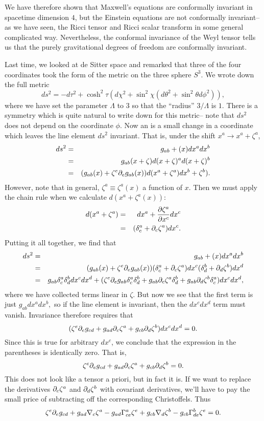 We have therefore shown that Maxwell's equations are conformally invariant in spacetime dimension $4$, but the Einstein equations are not conformally invariant-- as we have seen, the Ricci tensor and Ricci scalar transform in some general complicated way. Nevertheless, the conformal invariance of the Weyl tensor tells us that the purely gravitational degrees of freedom are conformally invariant.

Last time, we looked at de Sitter space and remarked that three of the four coordinates took the form of the metric on the three sphere $S^3$. We wrote down the full metric
$$ds^2=-d\tau^2+\cosh^2\tau \left(d\chi^2 + \sin^2\chi (d\theta^2+\sin^2\theta d\phi^2)\right),$$
where we have set the parameter $\Lambda$ to $3$ so that the ``radius'' $3/\Lambda$ is $1$.
There is a symmetry which is quite natural to write down for this metric-- note that $ds^2$ does not depend on the coordinate $\phi$. Now an  is a small change in a coordinate which leaves the line element $ds^2$ invariant. That is, under the shift $x^a\to x^a +\zeta^a$,
\begin{eqnarray*}
ds^2&=& g_{ab}+(x) dx^a dx^b\\
&=&g_{ab}(x+\zeta)d(x+\zeta)^a d(x+\zeta)^b\\
&=&(g_{ab}(x)+\zeta^e \partial_e g_{ab}(x)) d(x^a+\zeta^a) dx^b+\zeta^b).
\end{eqnarray*}
However, note that in general, $\zeta^a \equiv \zeta^a(x)$ a function of $x$. Then we must apply the chain rule when we calculate $d(x^a+\zeta^a(x)):$
\begin{eqnarray*}
d(x^a+\zeta^a)&=&dx^a+ \frac{\partial \zeta^a}{\partial x^c} dx^c\\
&=&(\delta^a_c +\partial_c \zeta^a)dx^c.
\end{eqnarray*}
Putting it all together, we find that
\begin{eqnarray*}
ds^2&=& g_{ab}+(x) dx^a dx^b\\
&=&(g_{ab}(x)+\zeta^e \partial_e g_{ab}(x)) (\delta^a_c + \partial_c \zeta^a)dx^c (\delta^b_d+\partial_d \zeta^b) dx^d\\
&=& g_{ab} \delta^a_c \delta^b_d dx^c dx^d + (\zeta^e \partial_e g_{ab} \delta^a_c \delta^b_d + g_{ab} \partial_c \zeta^a \delta^b_d + g_{ab} \partial_d \zeta^b \delta^a_c)dx^c dx^d,
\end{eqnarray*}
where we have collected terms linear in $\zeta$. But now we see that the first term is just $g_{ab} dx^a dx^b,$ so if the line element is invariant, then the $dx^c dx^d$ term must vanish. Invariance therefore requires that
$$(\zeta^e \partial_e g_{cd} + g_{ad} \partial_c \zeta^a +g_{cb} \partial_d \zeta^b)dx^c dx^d=0.$$
Since this is true for arbitrary $dx^c$, we conclude that the expression in the parentheses is identically zero. That is,
$$\zeta^e \partial_e g_{cd} + g_{ad} \partial_c \zeta^a +g_{cb} \partial_d \zeta^b=0.$$
This does not look like a tensor a priori, but in fact it is. If we want to replace the derivatives $\partial_c \zeta^a$ and $\partial_d \zeta^b$ with covariant derivatives, we'll have to pay the small price of subtracting off the corresponding Christoffels. Thus
$$\zeta^e \partial_e g_{cd} + g_{ad} \nabla_c \zeta^a - g_{ad}\Gamma^a_{ce} \zeta^e+g_{cb} \nabla_d \zeta^b - g_{cb} \Gamma^b_{de}\zeta^e=0.$$

